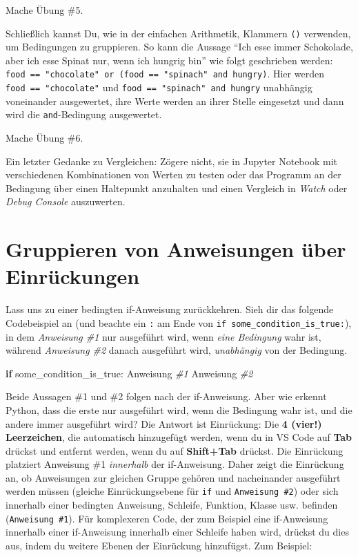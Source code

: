\documentclass[
]{book}
\newenvironment{Shaded}{\begin{snugshade}}{\end{snugshade}}
\newcommand{\CommentTok}[1]{\textcolor[rgb]{0.56,0.35,0.01}{\textit{#1}}}
\newcommand{\ControlFlowTok}[1]{\textcolor[rgb]{0.13,0.29,0.53}{\textbf{#1}}}
\newcommand{\NormalTok}[1]{#1}
\begin{document}
Mache Übung \#5.

Schließlich kannst Du, wie in der einfachen Arithmetik, Klammern \texttt{()} verwenden, um Bedingungen zu gruppieren. So kann die Aussage ``Ich esse immer Schokolade, aber ich esse Spinat nur, wenn ich hungrig bin'' wie folgt geschrieben werden: \texttt{food\ ==\ "chocolate"\ or\ (food\ ==\ "spinach"\ and\ hungry)}. Hier werden \texttt{food\ ==\ "chocolate"} und \texttt{food\ ==\ "spinach"\ and\ hungry} unabhängig voneinander ausgewertet, ihre Werte werden an ihrer Stelle eingesetzt und dann wird die \texttt{and}-Bedingung ausgewertet.

Mache Übung \#6.

Ein letzter Gedanke zu Vergleichen: Zögere nicht, sie in Jupyter Notebook mit verschiedenen Kombinationen von Werten zu testen oder das Programm an der Bedingung über einen Haltepunkt anzuhalten und einen Vergleich in \emph{Watch} oder \emph{Debug Console} auszuwerten.

\hypertarget{indentation}{%
\section{Gruppieren von Anweisungen über Einrückungen}\label{indentation}}

Lass uns zu einer bedingten if-Anweisung zurückkehren. Sieh dir das folgende Codebeispiel an (und beachte ein \texttt{:} am Ende von \texttt{if\ some\_condition\_is\_true:}), in dem \emph{Anweisung \#1} nur ausgeführt wird, wenn \emph{eine Bedingung} wahr ist, während \emph{Anweisung \#2} danach ausgeführt wird, \emph{unabhängig} von der Bedingung.

\begin{Shaded}
\begin{Highlighting}[]
\ControlFlowTok{if}\NormalTok{ some\_condition\_is\_true:}
\NormalTok{    Anweisung }\CommentTok{\#1}
\NormalTok{Anweisung }\CommentTok{\#2 }
\end{Highlighting}
\end{Shaded}

Beide Aussagen \#1 und \#2 folgen nach der if-Anweisung. Aber wie erkennt Python, dass die erste nur ausgeführt wird, wenn die Bedingung wahr ist, und die andere immer ausgeführt wird? Die Antwort ist Einrückung: Die \textbf{4 (vier!) Leerzeichen}, die automatisch hinzugefügt werden, wenn du in VS Code auf \textbf{Tab} drückst und entfernt werden, wenn du auf \textbf{Shift+Tab} drückst. Die Einrückung platziert Anweisung \#1 \emph{innerhalb} der if-Anweisung. Daher zeigt die Einrückung an, ob Anweisungen zur gleichen Gruppe gehören und nacheinander ausgeführt werden müssen (gleiche Einrückungsebene für \texttt{if} und \texttt{Anweisung\ \#2}) oder sich innerhalb einer bedingten Anweisung, Schleife, Funktion, Klasse usw. befinden (\texttt{Anweisung\ \#1}). Für komplexeren Code, der zum Beispiel eine if-Anweisung innerhalb einer if-Anweisung innerhalb einer Schleife haben wird, drückst du dies aus, indem du weitere Ebenen der Einrückung hinzufügst. Zum Beispiel:
\end{document}
